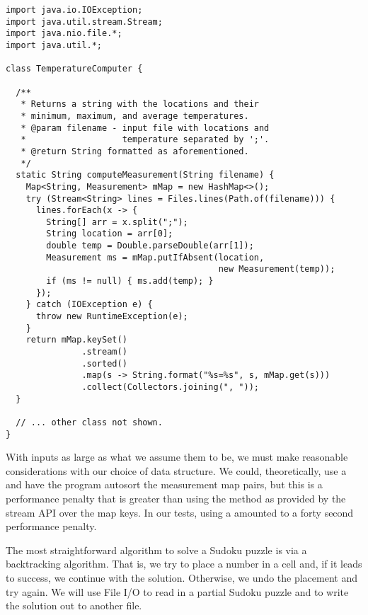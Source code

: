 \begin{lstlisting}[language=MyJava]
import java.io.IOException;
import java.util.stream.Stream;
import java.nio.file.*;
import java.util.*;

class TemperatureComputer {

  /**
   * Returns a string with the locations and their 
   * minimum, maximum, and average temperatures.
   * @param filename - input file with locations and 
   *                   temperature separated by ';'.
   * @return String formatted as aforementioned.
   */
  static String computeMeasurement(String filename) {
    Map<String, Measurement> mMap = new HashMap<>();
    try (Stream<String> lines = Files.lines(Path.of(filename))) {
      lines.forEach(x -> {
        String[] arr = x.split(";");
        String location = arr[0];
        double temp = Double.parseDouble(arr[1]);
        Measurement ms = mMap.putIfAbsent(location, 
                                          new Measurement(temp));
        if (ms != null) { ms.add(temp); }
      });
    } catch (IOException e) {
      throw new RuntimeException(e);
    }
    return mMap.keySet()
               .stream()
               .sorted()
               .map(s -> String.format("%s=%s", s, mMap.get(s)))
               .collect(Collectors.joining(", "));
  }

  // ... other class not shown.
}
\end{lstlisting}

With inputs as large as what we assume them to be, we must make reasonable considerations with our choice of data structure. We could, theoretically, use a  and have the program autosort the measurement map pairs, but this is a performance penalty that is greater than using the  method as provided by the stream API over the map keys. In our tests, using a  amounted to a forty second performance penalty.


The most straightforward algorithm to solve a Sudoku puzzle is via a backtracking algorithm. That is, we try to place a number in a cell and, if it leads to success, we continue with the solution. Otherwise, we undo the placement and try again. We will use File I/O to read in a partial Sudoku puzzle and to write the solution out to another file.

